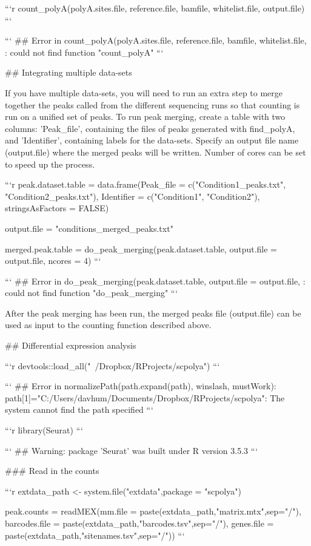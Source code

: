 ```r
count_polyA(polyA.sites.file, reference.file, bamfile, whitelist.file, output.file) 
```

```
## Error in count_polyA(polyA.sites.file, reference.file, bamfile, whitelist.file, : could not find function "count_polyA"
```

## Integrating multiple data-sets

If you have multiple data-sets, you will need to run an extra step to merge together the peaks called from the different sequencing runs so that counting is run on a unified set of peaks. To run peak merging, create a table with two columns: 'Peak_file', containing the files of peaks generated with find_polyA, and 'Identifier', containing labels for the data-sets. Specify an output file name (output.file) where the merged peaks will be written. Number of cores can be set to speed up the process. 


```r
peak.dataset.table = data.frame(Peak_file = c("Condition1_peaks.txt", "Condition2_peaks.txt"),
                                Identifier = c("Condition1", "Condition2"), stringsAsFactors = FALSE)

output.file = "conditions_merged_peaks.txt"

merged.peak.table = do_peak_merging(peak.dataset.table, output.file = output.file, ncores = 4)
```

```
## Error in do_peak_merging(peak.dataset.table, output.file = output.file, : could not find function "do_peak_merging"
```

After the peak merging has been run, the merged peaks file (output.file) can be used as input to the counting function described above.




## Differential expression analysis


```r
devtools::load_all("~/Dropbox/RProjects/scpolya")
```

```
## Error in normalizePath(path.expand(path), winslash, mustWork): path[1]="C:/Users/davhum/Documents/Dropbox/RProjects/scpolya": The system cannot find the path specified
```

```r
library(Seurat)
```

```
## Warning: package 'Seurat' was built under R version 3.5.3
```

### Read in the counts

```r
extdata_path <- system.file("extdata",package = "scpolya")

peak.counts = readMEX(mm.file = paste(extdata_path,"matrix.mtx",sep="/"),
                      barcodes.file = paste(extdata_path,"barcodes.tsv",sep="/"),
                      genes.file = paste(extdata_path,"sitenames.tsv",sep="/"))
```

